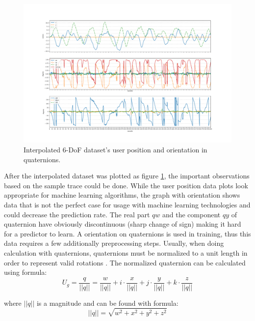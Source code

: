 \begin{figure}[htb]
	\begin{center}
		\includegraphics[width=1\textwidth, keepaspectratio]{gfx/Fig-1556-interpolated_2.pdf}
		\caption{\label{fig:inter_data}Interpolated 6-DoF dataset's user position and orientation in quaternions.}
	\end{center}
\end{figure}

After the interpolated dataset was plotted as figure \ref{fig:inter_data}, the important observations based on the sample trace could be done. While the user position data plots look appropriate for machine learning algorithms, the graph with orientation shows data that is not the perfect case for usage with machine learning technologies and could decrease the prediction rate. The real part $qw$ and the component $qy$ of quaternion have obviously discontinuous (sharp change of sign) making it hard for a predictor to learn. A orientation on quaternions is used in training, thus this data requires a few additionally preprocessing steps. Usually, when doing calculation with quaternions, quaternions must be normalized to a unit length in order to represent valid rotations \cite{principles_robot_motion_book}. The normalized quaternion can be calculated using formula:
\begin{equation}
U_g = \frac{q}{|| q ||} = \frac{w}{|| q ||} + i \cdot \frac{x}{|| q ||} + j \cdot \frac{y}{|| q ||} + k \cdot \frac{z}{|| q ||}
\end{equation}

where $|| q || $ is a magnitude and can be found with formula:
\begin{equation}
|| q || = \sqrt{w^2 + x^2 + y^2 + z^2 }
\end{equation}

